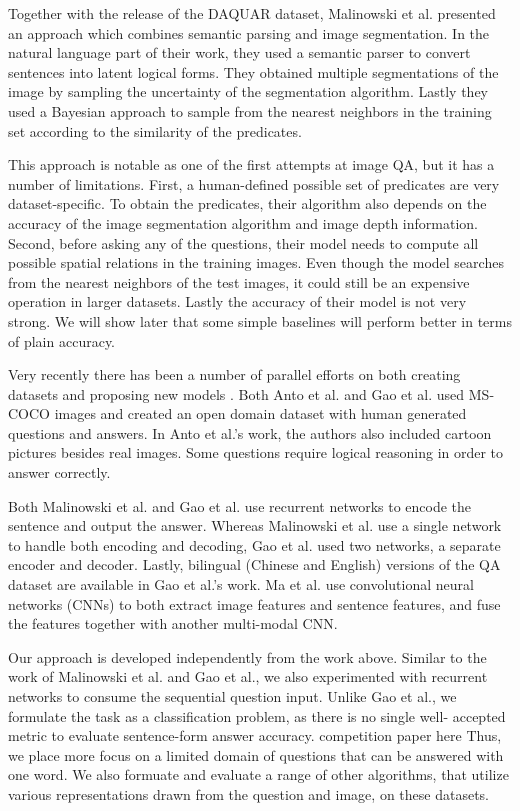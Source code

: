\documentclass{article} %
\renewcommand{\#}[1]{\textbf{#1}}
\begin{document}
Together with the release of the DAQUAR dataset, Malinowski et al. presented an
approach which combines semantic parsing and image segmentation. In the natural
language part of their work, they used a semantic parser \cite{liang13} to
convert sentences into latent logical forms. They obtained multiple
segmentations of the image by sampling the uncertainty of the segmentation
algorithm. Lastly they used a Bayesian approach to sample from the nearest
neighbors in the training set according to the similarity of the predicates.

This approach is notable as one of the first attempts at image QA, but it has a
number of limitations. First, a human-defined possible set of predicates are
very dataset-specific. To obtain the predicates, their algorithm also depends
on the accuracy of the image segmentation algorithm and image depth
information. Second, before asking any of the questions, their model needs to
compute all possible spatial relations in the training images. Even though the
model searches from the nearest neighbors of the test images, it could still be
an expensive operation in larger datasets. Lastly the accuracy of their model
is not very strong. We will show later that some simple baselines will perform
better in terms of plain accuracy.

Very recently there has been a number of parallel efforts on both creating
datasets and proposing new models \cite{antol14, malinowski15, gao15, ma15}.
Both Anto et al. \cite{antol14} and Gao et al. \cite{gao15} used MS-COCO
\cite{mscoco} images and created an open domain dataset with human generated
questions and answers. In Anto et al.'s work, the authors also included cartoon
pictures besides real images. Some questions require logical reasoning in order
to answer correctly.

Both Malinowski et al. \cite{malinowski15} and Gao et al. \cite{gao15} use
recurrent networks to encode the sentence and output the answer. Whereas
Malinowski et al. use a single network to handle both encoding and decoding,
Gao et al. used two networks, a separate encoder and decoder. Lastly, bilingual
(Chinese and English) versions of the QA dataset are available in Gao et al.'s
work. Ma et al. \cite{ma15} use convolutional neural networks (CNNs) to both
extract image features and sentence features, and fuse the features together
with another multi-modal CNN.

Our approach is developed independently from the work above. Similar to the
work of Malinowski et al. and Gao et al., we also experimented with recurrent
networks to consume the sequential question input. Unlike Gao et al., we
formulate the task as a classification problem, as there is no single well-
accepted metric to evaluate sentence-form answer accuracy.
\cite{mscoco_captions} competition paper here Thus, we place more focus on a
limited domain of questions that can be answered with one word. We also
formuate and evaluate a range of other algorithms, that utilize various
representations drawn from the question and image, on these datasets.
\end{document}
